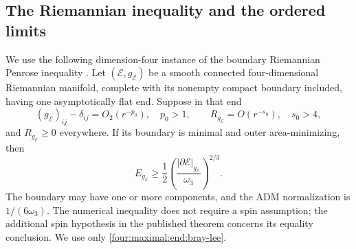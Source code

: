 \subsection{The Riemannian inequality and the ordered limits}

We use the following dimension-four instance of the boundary
Riemannian Penrose inequality
\cite[Theorem~1.4, p.~84]{BrayLee2009}.  Let $(\mathscr E,g_{\mathscr E})$ be a smooth
connected four-dimensional Riemannian manifold, complete with its
nonempty compact boundary included, having one asymptotically flat
end.  Suppose in that end
\[
 (g_{\mathscr E})_{ij}-\delta_{ij}=O_2(r^{-p_0}),\quad p_0>1,
 \qquad R_{g_{\mathscr E}}=O(r^{-s_0}),\quad s_0>4,
\]
and $R_{g_{\mathscr E}}\ge0$ everywhere.  If its boundary is minimal and outer
area-minimizing, then
\begin{equation}\label{four:maximal:end:bray-lee}
 E_{g_{\mathscr E}}\ge\frac12
          \left(\frac{|\partial\mathscr E|_{g_{\mathscr E}}}{\omega_3}\right)^{2/3}.
\end{equation}
The boundary may have one or more components, and the ADM
normalization is $1/(6\omega_3)$.  The numerical inequality does not
require a spin assumption; the additional spin hypothesis in the
published theorem concerns its equality conclusion.  We use only
\eqref{four:maximal:end:bray-lee}.


